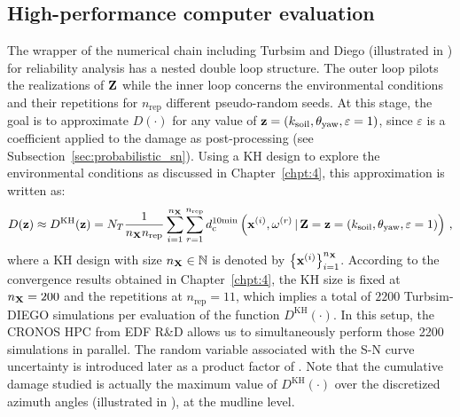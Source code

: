 \subsection{High-performance computer evaluation}
The wrapper of the numerical chain including Turbsim and Diego (illustrated in ) for reliability analysis has a nested double loop structure. 
The outer loop pilots the realizations of ${\bf Z}$ while the inner loop concerns the environmental conditions and their repetitions for $n_{\mathrm{rep}}$ different pseudo-random seeds. 
At this stage, the goal is to approximate $D(\cdot)$ for any value of ${\bf z} = (k_{\mathrm{soil}}, \theta_{\mathrm{yaw}}, \varepsilon=1)$, since $\varepsilon$ is a coefficient applied to the damage as post-processing (see Subsection~\ref{sec:probabilistic_sn}). 
Using a KH design to explore the environmental conditions as discussed in Chapter~\ref{chpt:4}, this approximation is written as: 
\begin{equation}
    D({\bf z}) \approx D^{\mathrm{KH}}({\bf z}) = N_T \frac{1}{n_{\bf X} n_{\mathrm{rep}}} \sum_{i=1}^{n_{\bf X}} \sum_{r=1}^{n_{\mathrm{rep}}} d_{\mathrm{c}}^{10\mathrm{min}}\left({\bf x}^{(i)}, \omega^{(r)} \,|\, {\bf Z} = {\bf z} = (k_{\mathrm{soil}}, \theta_{\mathrm{yaw}}, \varepsilon=1)\right)\, ,
    \label{eq:hpc_cumulated_damage}
\end{equation}
where a KH design with size $n_{\bf X} \in \mathbb{N}$ is denoted by $\left\{{\bf x}^{(i)}\right\}_{i=1}^{n_{\bf X}}$. 
According to the convergence results obtained in Chapter~\ref{chpt:4}, the KH size is fixed at $n_{\bf X}=200$ and the repetitions at $n_{\mathrm{rep}}=11$, which implies a total of $2200$ Turbsim-DIEGO simulations per evaluation of the function $D^{\mathrm{KH}}(\cdot)$. 
In this setup, the CRONOS HPC from EDF R\&D allows us to simultaneously perform those 2200 simulations in parallel. 
The random variable associated with the S-N curve uncertainty is introduced later as a product factor of . 
Note that the cumulative damage studied is actually the maximum value of $D^{\mathrm{KH}}(\cdot)$ over the discretized azimuth angles (illustrated in ), at the mudline level. 


